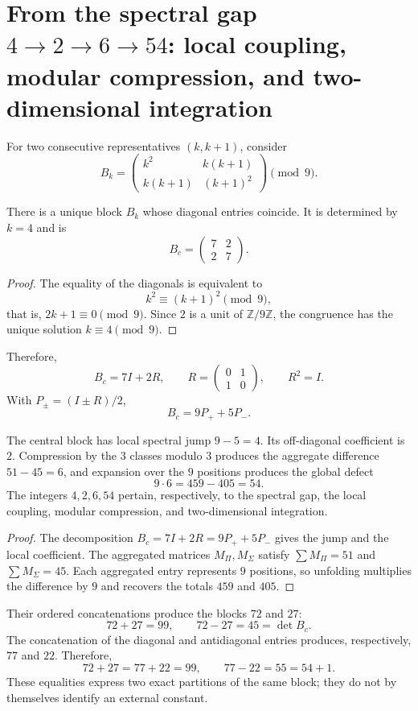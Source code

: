 \section{From the spectral gap \texorpdfstring{\(4\to2\to6\to54\)}{4 to 2 to 6 to 54}: local coupling, modular compression, and two-dimensional integration}
\label{sec:sucesor83-salto-espectral-4-2-6-54}

For two consecutive representatives \((k,k+1)\), consider
\[
B_k=
\begin{pmatrix}
k^2&k(k+1)\\
k(k+1)&(k+1)^2
\end{pmatrix}\pmod 9.
\]

\begin{theorem}
\label{thm:sucesor83-app-bloque-central}
There is a unique block \(B_k\) whose diagonal entries coincide. It is
determined by \(k=4\) and is
\[
B_c=\begin{pmatrix}7&2\\2&7\end{pmatrix}.
\]
\end{theorem}

\begin{proof}
The equality of the diagonals is equivalent to
\[
k^2\equiv(k+1)^2\pmod 9,
\]
that is, \(2k+1\equiv0\pmod 9\). Since \(2\) is a unit of
\(\mathbb Z/9\mathbb Z\), the congruence has the unique solution
\(k\equiv4\pmod 9\).
\end{proof}

Therefore,
\[
B_c=7I+2R,
\qquad
R=\begin{pmatrix}0&1\\1&0\end{pmatrix},
\qquad R^2=I.
\]
With \(P_\pm=(I\pm R)/2\),
\[
B_c=9P_++5P_-.
\]

\begin{theorem}
\label{thm:sucesor83-app-jerarquia-4-2-6-54}
The central block has local spectral jump \(9-5=4\). Its off-diagonal
coefficient is \(2\). Compression by the \(3\) classes modulo
\(3\) produces the aggregate difference \(51-45=6\), and expansion
over the \(9\) positions produces the global defect
\[
9\cdot6=459-405=54.
\]
The integers \(4,2,6,54\) pertain, respectively, to the spectral gap,
the local coupling, modular compression, and two-dimensional
integration.
\end{theorem}

\begin{proof}
The decomposition \(B_c=7I+2R=9P_++5P_-\) gives the jump and the local
coefficient. The aggregated matrices \(M_\Pi,M_\Sigma\) satisfy
\(\sum M_\Pi=51\) and \(\sum M_\Sigma=45\). Each aggregated entry represents
\(9\) positions, so unfolding multiplies the difference by
\(9\) and recovers the totals \(459\) and \(405\).
\end{proof}

Their ordered concatenations produce the blocks \(72\) and \(27\):
\[
72+27=99,
\qquad
72-27=45=\det B_c.
\]
The concatenation of the diagonal and antidiagonal entries produces,
respectively, \(77\) and \(22\). Therefore,
\[
72+27=77+22=99,
\qquad
77-22=55=54+1.
\]
These equalities express two exact partitions of the same block; they do not
by themselves identify an external constant.

